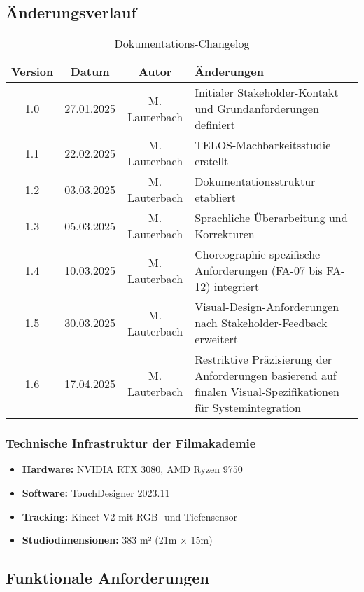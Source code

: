 \subsection{Änderungsverlauf}
\begin{table}[h]
    \centering
    \begin{tabular}{|c|c|c|p{7cm}|}
        \hline
        \textbf{Version} & \textbf{Datum} & \textbf{Autor} & \textbf{Änderungen} \\ \hline
        1.0 & 27.01.2025 & M. Lauterbach & Initialer Stakeholder-Kontakt und Grundanforderungen definiert \\ \hline
        1.1 & 22.02.2025 & M. Lauterbach & TELOS-Machbarkeitsstudie erstellt \\ \hline
        1.2 & 03.03.2025 & M. Lauterbach & Dokumentationsstruktur etabliert \\ \hline
        1.3 & 05.03.2025 & M. Lauterbach & Sprachliche Überarbeitung und Korrekturen \\ \hline
        1.4 & 10.03.2025 & M. Lauterbach & Choreographie-spezifische Anforderungen (FA-07 bis FA-12) integriert \\ \hline
        1.5 & 30.03.2025 & M. Lauterbach & Visual-Design-Anforderungen nach Stakeholder-Feedback erweitert \\ \hline
        1.6 & 17.04.2025 & M. Lauterbach & Restriktive Präzisierung der Anforderungen basierend auf finalen Visual-Spezifikationen für Systemintegration \\ \hline
    \end{tabular}
    \caption{Dokumentations-Changelog}
    \label{tab:changelog}
\end{table}

\subsubsection{Technische Infrastruktur der Filmakademie}
\begin{itemize}
    \item \textbf{Hardware:} NVIDIA RTX 3080, AMD Ryzen 9750
    \item \textbf{Software:} TouchDesigner 2023.11
    \item \textbf{Tracking:} Kinect V2 mit RGB- und Tiefensensor
    \item \textbf{Studiodimensionen:} 383 m² (21m × 15m)
\end{itemize}

\subsection{Funktionale Anforderungen}

